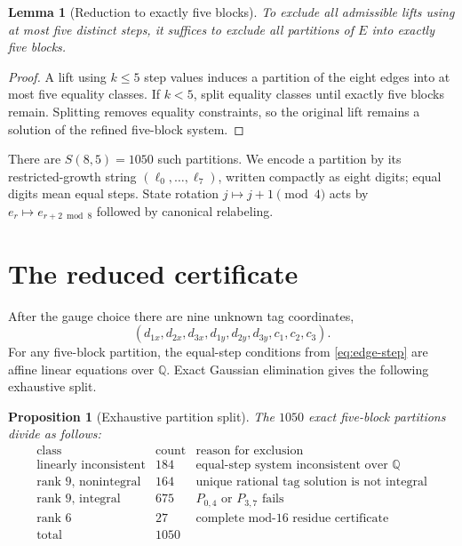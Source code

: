\documentclass[11pt]{article}
\newtheorem{lemma}{Lemma}
\newtheorem{proposition}{Proposition}
\newcommand{\QQ}{\mathbb{Q}}
\newcommand{\PPair}[2]{P_{#1,#2}}
\begin{document}
\begin{lemma}[Reduction to exactly five blocks]\label{lem:five-block}
To exclude all admissible lifts using at most five distinct steps, it suffices
to exclude all partitions of $E$ into exactly five blocks.
\end{lemma}
\begin{proof}
A lift using $k\le5$ step values induces a partition of the eight edges into at
most five equality classes. If $k<5$, split equality classes until exactly five
blocks remain. Splitting removes equality constraints, so the original lift
remains a solution of the refined five-block system.
\end{proof}

There are $S(8,5)=1050$ such partitions. We encode a partition by its
restricted-growth string $(\ell_0,\dots,\ell_7)$, written compactly as eight
digits; equal digits mean equal steps. State rotation $j\mapsto j+1\pmod4$
acts by $e_r\mapsto e_{r+2\bmod8}$ followed by canonical relabeling.

\section{The reduced certificate}
After the gauge choice there are nine unknown tag coordinates,
\[
(d_{1x},d_{2x},d_{3x},d_{1y},d_{2y},d_{3y},c_1,c_2,c_3).
\]
For any five-block partition, the equal-step conditions from
\eqref{eq:edge-step} are affine linear equations over $\QQ$. Exact Gaussian
elimination gives the following exhaustive split.

\begin{proposition}[Exhaustive partition split]\label{prop:split}
The $1050$ exact five-block partitions divide as follows:
\[
\begin{array}{c|r|l}
\text{class} & \text{count} & \text{reason for exclusion}\\ \hline
\text{linearly inconsistent}&184&\text{equal-step system inconsistent over }\QQ\\
\text{rank }9\text{, nonintegral}&164&\text{unique rational tag solution is not integral}\\
\text{rank }9\text{, integral}&675&\PPair{0}{4}\text{ or }\PPair{3}{7}\text{ fails}\\
\text{rank }6&27&\text{complete mod-16 residue certificate}\\ \hline
\text{total}&1050&
\end{array}
\]
\end{proposition}
\end{document}
